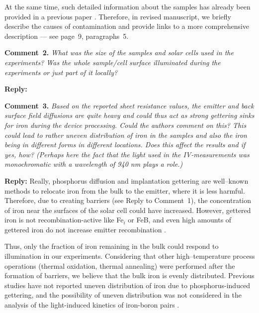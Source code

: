 \documentclass{WileyMSP-template}
\begin{document}
At the same time, such detailed information about the samples has already been provided in a previous paper \cite{Olikh2021JAP}.
Therefore, in revised manuscript, we briefly describe the causes of contamination and provide links
to a more comprehensive description --- see page~9, paragraphs~5.


\vspace{1cm}
\noindent
\textcolor[rgb]{0.00,0.50,1.00}{\textbf{Comment~2.}}
\emph{What was the size of the samples and solar cells used in the experiments?
Was the whole sample/cell surface illuminated during the experiments or just part of it locally?}

\noindent
\textcolor[rgb]{0.51,0.00,0.00}{\textbf{Reply:}}



\vspace{1cm}
\noindent
\textcolor[rgb]{0.00,0.50,1.00}{\textbf{Comment~3.}}
\emph{Based on the reported sheet resistance values,
the emitter and back surface field diffusions are quite heavy and could thus act as strong gettering sinks for iron during the device processing.
Could the authors comment on this?
This could lead to rather uneven distribution of iron in the samples and also the iron being in different forms in different locations.
Does this affect the results and if yes, how?
(Perhaps here the fact that the light used in the IV-measurements was monochromatic with a wavelength of 940 nm plays a role.)}

\noindent
\textcolor[rgb]{0.51,0.00,0.00}{\textbf{Reply:}}
Really, phosphorus diffusion \cite{FeB:Vahanissi} and implantation \cite{LaineIEEEPV2016,FeBKin2019} gettering 
are well--known methods to relocate iron from the bulk to the emitter, where it is less harmful.
Therefore, due to creating barriers (see Reply to Comment~1), the concentration of iron near the surfaces of the solar cell could have increased. 
However, gettered iron is not recombination-active like 
Fe$_i$ or FeB, and even high amounts of gettered iron do not increase emitter recombination \cite{FeB:Vahanissi}.

Thus, only the fraction of iron remaining in the bulk could respond to illumination in our experiments. 
Considering that other high--temperature process operations (thermal oxidation, thermal annealing) were performed after the formation of barriers, 
we believe that the bulk iron is evenly distributed. 
Previous studies have not reported uneven distribution of iron due to phosphorus-induced gettering, 
and the possibility of uneven distribution was not considered in the analysis of the light-induced kinetics of iron-boron pairs \cite{LaineIEEEPV2016,FeBKin2019}.
\end{document}
